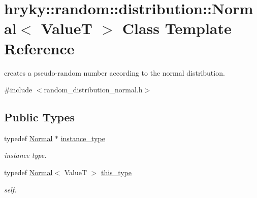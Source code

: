 \hypertarget{classhryky_1_1random_1_1distribution_1_1_normal}{\section{hryky\-:\-:random\-:\-:distribution\-:\-:Normal$<$ Value\-T $>$ Class Template Reference}
\label{classhryky_1_1random_1_1distribution_1_1_normal}
}


creates a pseudo-\/random number according to the normal distribution.  




{\ttfamily \#include $<$random\-\_\-distribution\-\_\-normal.\-h$>$}

\subsection*{Public Types}
\begin{DoxyCompactItemize}
\item 
\hypertarget{classhryky_1_1random_1_1distribution_1_1_normal_a956f2d07ebcd0465fc6b377553ca3a3c}{typedef \hyperlink{classhryky_1_1random_1_1distribution_1_1_normal}{Normal} $\ast$ \hyperlink{classhryky_1_1random_1_1distribution_1_1_normal_a956f2d07ebcd0465fc6b377553ca3a3c}{instance\-\_\-type}}\label{classhryky_1_1random_1_1distribution_1_1_normal_a956f2d07ebcd0465fc6b377553ca3a3c}

\begin{DoxyCompactList}\small\item\em instance type. \end{DoxyCompactList}\item 
\hypertarget{classhryky_1_1random_1_1distribution_1_1_normal_ac188537d4215bbeff9618ed53aceffd9}{typedef \hyperlink{classhryky_1_1random_1_1distribution_1_1_normal}{Normal}$<$ Value\-T $>$ \hyperlink{classhryky_1_1random_1_1distribution_1_1_normal_ac188537d4215bbeff9618ed53aceffd9}{this\-\_\-type}}\label{classhryky_1_1random_1_1distribution_1_1_normal_ac188537d4215bbeff9618ed53aceffd9}

\begin{DoxyCompactList}\small\item\em self. \end{DoxyCompactList}\end{DoxyCompactItemize}
